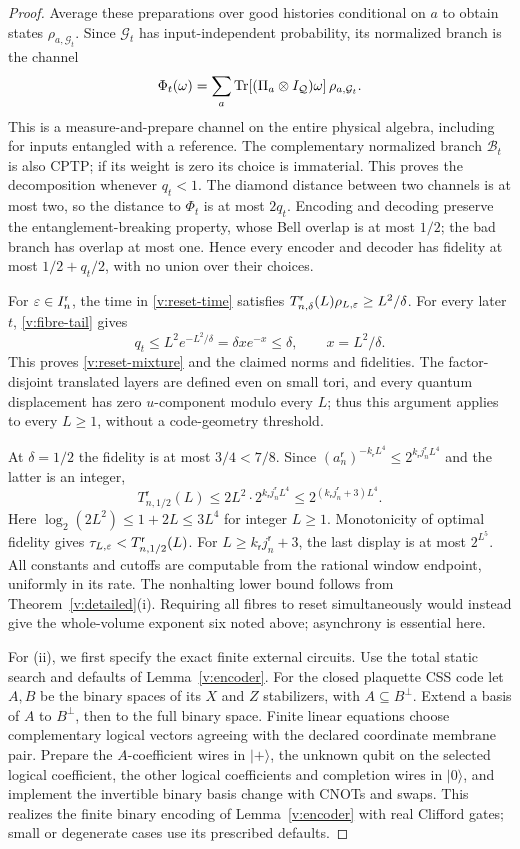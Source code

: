 \begin{proof}
Average these preparations over good histories conditional on \(a\)
to obtain states \(\rho_{a,\mathcal G_t}\). Since \(\mathcal G_t\) has
input-independent probability, its normalized branch is the channel
\[
 \Phi_t(\omega)=\sum_a
 \operatorname{Tr}[(\Pi_a\otimes I_{\mathcal Q})\omega]\,\rho_{a,\mathcal G_t}.
\]
This is a measure-and-prepare channel on the entire physical algebra,
including for inputs entangled with a reference. The complementary
normalized branch \(\mathcal B_t\) is also CPTP; if its weight is
zero its choice is immaterial. This proves the decomposition whenever
\(q_t<1\). The diamond distance between two channels is at most two,
so the distance to \(\Phi_t\) is at most \(2q_t\). Encoding and
decoding preserve the entanglement-breaking property, whose Bell
overlap is at most \(1/2\); the bad branch has overlap at most one.
Hence every encoder and decoder has fidelity at most
\(1/2+q_t/2\), with no union over their choices.

For \(\varepsilon\in I_n^{\mathsf r}\), the time in
\eqref{v:reset-time} satisfies
\(T^{\mathsf r}_{n,\delta}(L)\rho_{L,\varepsilon}\ge L^2/\delta\).
For every later \(t\), \eqref{v:fibre-tail} gives
\[
 q_t\le L^2e^{-L^2/\delta}
 =\delta x e^{-x}\le\delta,
 \qquad x=L^2/\delta.
\]
This proves \eqref{v:reset-mixture} and the claimed norms and
fidelities. The factor-disjoint translated layers are defined even
on small tori, and every quantum displacement has zero
\(u\)-component modulo every \(L\); thus this argument applies to
every \(L\ge1\), without a code-geometry threshold.

At \(\delta=1/2\) the fidelity is at most \(3/4<7/8\). Since
\((a_n^{\mathsf r})^{-k_{\mathsf r}L^4}
\le2^{k_{\mathsf r}j_n^{\mathsf r}L^4}\) and the latter is an integer,
\[
 T^{\mathsf r}_{n,1/2}(L)
 \le2L^2\cdot2^{k_{\mathsf r}j_n^{\mathsf r}L^4}
 \le2^{(k_{\mathsf r}j_n^{\mathsf r}+3)L^4}.
\]
Here \(\log_2(2L^2)\le1+2L\le3L^4\) for integer \(L\ge1\).
Monotonicity of optimal fidelity gives
\(\tau_{L,\varepsilon}<T^{\mathsf r}_{n,1/2}(L)\).
For \(L\ge k_{\mathsf r}j_n^{\mathsf r}+3\), the last display is
at most \(2^{L^5}\). All constants and cutoffs are computable from
the rational window endpoint, uniformly in its rate.
The nonhalting lower bound follows from Theorem~\ref{v:detailed}(i).
Requiring all fibres to reset simultaneously would instead give the
whole-volume exponent six noted above; asynchrony is essential here.

For (ii), we first specify the exact finite external circuits. Use
the total static search and defaults of Lemma~\ref{v:encoder}.
For the closed plaquette CSS code let \(A,B\) be the binary spaces
of its \(X\) and \(Z\) stabilizers, with \(A\subseteq B^\perp\). Extend a
basis of \(A\) to \(B^\perp\), then to the full binary space.
Finite linear equations choose complementary logical vectors agreeing
with the declared coordinate membrane pair. Prepare the
\(A\)-coefficient wires in \(\lvert+\rangle\), the unknown qubit
on the selected logical coefficient, the other logical coefficients
and completion wires in \(\lvert0\rangle\), and implement the
invertible binary basis change with CNOTs and swaps. This realizes
the finite binary encoding of Lemma~\ref{v:encoder} with real
Clifford gates; small or degenerate cases use its prescribed defaults.


\end{proof}
